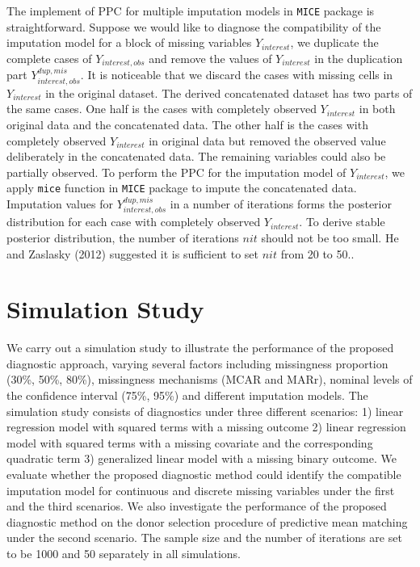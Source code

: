 \documentclass[12pt, fullpage, a4paper]{article}
\begin{document}
The implement of PPC for multiple imputation models in \texttt{MICE} package is straightforward. Suppose we would like to diagnose the compatibility of the imputation model for a block of missing variables $Y_{interest}$, we duplicate the complete cases of $Y_{interest, obs}$ and remove the values of $Y_{interest}$ in the duplication part $Y^{dup, mis}_{interest, obs}$. It is noticeable that we discard the cases with missing cells in $Y_{interest}$ in the original dataset. The derived concatenated dataset has two parts of the same cases. One half is the cases with completely observed $Y_{interest}$ in both original data and the concatenated data. The other half is the cases with completely observed $Y_{interest}$ in original data but removed the observed value deliberately in the concatenated data. The remaining variables could also be partially observed. To perform the PPC for the imputation model of $Y_{interest}$, we apply \texttt{mice} function in \texttt{MICE} package to impute the concatenated data. Imputation values for $Y^{dup, mis}_{interest, obs}$ in a number of iterations forms the posterior distribution for each case with completely observed $Y_{interest}$. To derive stable posterior distribution, the number of iterations $nit$ should not be too small. He and Zaslasky (2012) suggested it is sufficient to set $nit$ from 20 to 50..     

\section{Simulation Study}
We carry out a simulation study to illustrate the performance of the proposed diagnostic approach, varying several factors including missingness proportion (30\%, 50\%, 80\%), missingness mechanisms (MCAR and MARr), nominal levels of the confidence interval (75\%, 95\%) and different imputation models. The simulation study consists of diagnostics under three different scenarios: 1) linear regression model with squared terms with a missing outcome 2) linear regression model with squared terms with a missing covariate and the corresponding quadratic term 3) generalized linear model with a missing binary outcome. We evaluate whether the proposed diagnostic method could identify the compatible imputation model for continuous and discrete missing variables under the first and the third scenarios. We also investigate the performance of the proposed diagnostic method on the donor selection procedure of predictive mean matching under the second scenario. The sample size and the number of iterations are set to be 1000 and 50 separately in all simulations.  
\end{document}

